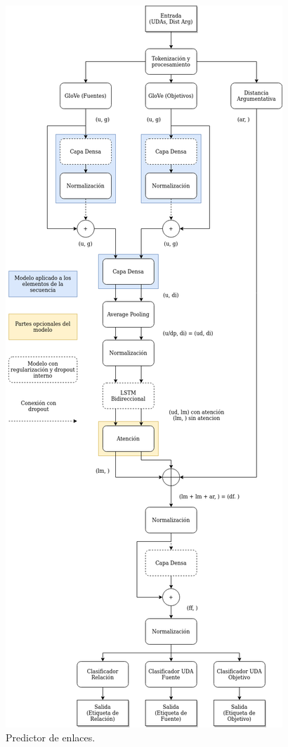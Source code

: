 \begin{figure}[h!]
	\begin{center}
		\begin{center}
			\includegraphics[scale=.3]{Graphics/Modelo_Link_Prediction.png}
        \end{center}
	    \caption{Predictor de enlaces.}\label{fig:link_predictor}
	\end{center}
\end{figure}

